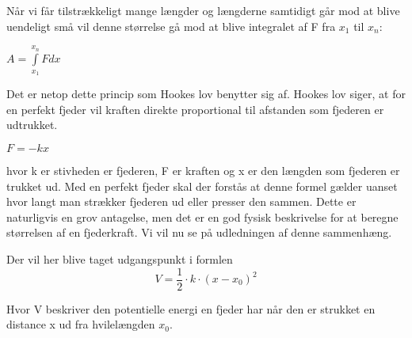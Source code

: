 Når vi får tilstrækkeligt mange længder og længderne samtidigt går mod at blive uendeligt små vil denne størrelse gå mod at blive integralet af F fra $x_1$ til $x_n$: 

\begin{center}
$A = \int\limits_{x_1}^{x_n} F dx$ 
\end{center}
\bigskip

Det er netop dette princip som Hookes lov benytter sig af. Hookes lov siger, at for en perfekt fjeder vil kraften direkte proportional til afstanden som fjederen er udtrukket. 

\begin{center}
$F = -kx$
\end{center}
\bigskip

hvor k er stivheden er fjederen, F er kraften og x er den længden som fjederen er trukket ud. Med en perfekt fjeder skal der forstås at denne formel gælder uanset hvor langt man strækker fjederen ud eller presser den sammen. Dette er naturligvis en grov antagelse, men det er en god fysisk beskrivelse for at beregne størrelsen af en fjederkraft. Vi vil nu se på udledningen af denne sammenhæng.

Der vil her blive taget udgangspunkt i formlen 
\begin{equation}
V=\dfrac{1}{2} \cdot k \cdot (x-x_{0})^2
\end{equation}

Hvor V beskriver den potentielle energi en fjeder har når den er strukket en distance x ud fra hvilelængden $x_0$. 
